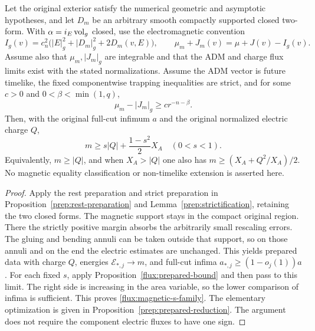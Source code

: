 \begin{corollary}
\label{flux:magnetic-extension}
Let the original exterior satisfy the numerical geometric and asymptotic
hypotheses, and let $D_m$ be an arbitrary smooth compactly supported closed
two-form.  With $\alpha=i_E\operatorname{vol}_g$ closed, use the electromagnetic convention
\begin{equation}
 I_g(v)=c_n^2\bigl(|E|_g^2+|D_m|_g^2+2D_m(v,E)\bigr),
 \qquad
 \mu_m+J_m(v)=\mu+J(v)-I_g(v).
 \label{flux:magnetic-convention}
\end{equation}
Assume also that $\mu_m,|J_m|_g$ are integrable and that the ADM and
charge flux limits exist with the stated normalizations.  Assume the ADM
vector is future timelike, the fixed componentwise trapping
inequalities are strict, and for some $c>0$ and
$0<\beta<\min(1,q)$,
\begin{equation}
 \mu_m-|J_m|_g\geq c r^{-n-\beta}.
 \label{flux:strict-magnetic-margin}
\end{equation}
Then, with the original full-cut infimum $a$ and the original normalized
electric charge $Q$,
\begin{equation}
 m\geq s|Q|+\frac{1-s^2}{2}X_A\quad(0<s<1).
 \label{flux:magnetic-s-family}
\end{equation}
Equivalently, $m\geq|Q|$, and when $X_A>|Q|$ one also has
$m\geq(X_A+Q^2/X_A)/2$.  No magnetic equality classification or
non-timelike extension is asserted here.
\end{corollary}

\begin{proof}
Apply the rest preparation and strict preparation in
Proposition~\ref{prep:rest-preparation} and
Lemma~\ref{prep:strictification}, retaining the two closed forms.  The
magnetic support stays in the compact original region.  There the strictly
positive margin absorbs the arbitrarily small rescaling errors.  The
gluing and bending annuli can be taken outside that support, so on those
annuli and on the end the electric estimates are unchanged.  This yields
prepared data with charge $Q$, energies $\mathcal E_{*,j}\to m$, and
full-cut infima $a_{*,j}\geq(1-o_j(1))a$.  For each fixed $s$, apply
Proposition~\ref{flux:prepared-bound} and then pass to this limit.  The
right side is increasing in the area variable, so the lower comparison of
infima is sufficient.  This proves \eqref{flux:magnetic-s-family}.  The
elementary optimization is given in
Proposition~\ref{prep:prepared-reduction}.  The argument does not require
the component electric fluxes to have one sign.
\end{proof}


